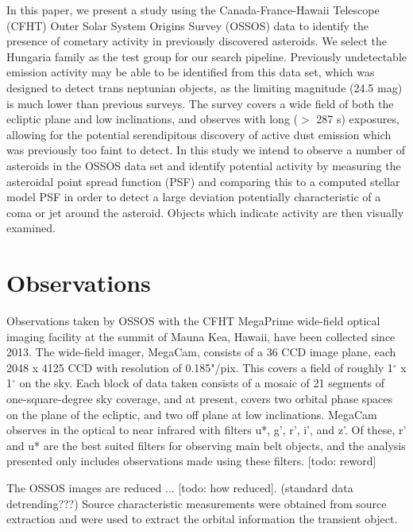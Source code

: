 \documentclass[iop,apj]{emulateapj}
\begin{document}
In this paper, we present a study using the Canada-France-Hawaii Telescope (CFHT) Outer Solar System Origins Survey (OSSOS) data to identify the presence of cometary activity in previously discovered asteroids. We select the Hungaria family as the test group for our search pipeline. Previously undetectable emission activity may be able to be identified from this data set, which was designed to detect trans neptunian objects, as the limiting magnitude (24.5 mag) is much lower than previous surveys. The survey covers a wide field of both the ecliptic plane and low inclinations, and observes with long ($>$ 287 s) exposures, allowing for the potential serendipitous discovery of active dust emission which was previously too faint to detect. In this study we intend to observe a number of asteroids in the OSSOS data set and identify potential activity by measuring the asteroidal point spread function (PSF) and comparing this to a computed stellar model PSF in order to detect a large deviation potentially characteristic of a coma or jet around the asteroid. Objects which indicate activity are then visually examined. 



\section{Observations}

Observations taken by OSSOS with the CFHT MegaPrime wide-field optical imaging facility  at the summit of Mauna Kea, Hawaii, have been collected since 2013. The wide-field imager, MegaCam, consists of a 36 CCD image plane, each 2048 x 4125 CCD with resolution of 0.185"/pix. This covers a field of  roughly 1$^{\circ}$ x 1$^{\circ}$ on the sky. Each block of data taken consists of a mosaic of 21 segments of one-square-degree sky coverage, and at present, covers two orbital phase spaces on the plane of the ecliptic, and two off plane at low inclinations. MegaCam observes in the optical to near infrared with filters u*, g', r', i', and z'. Of these, r' and u* are the best suited filters for observing main belt objects, and the analysis presented only includes observations made using these filters. [todo: reword]

The OSSOS images are reduced ... [todo: how reduced]. (standard data detrending???) Source characteristic measurements were obtained from source extraction \citep{sep} and were used to extract the orbital information the transient object. 
\end{document}

